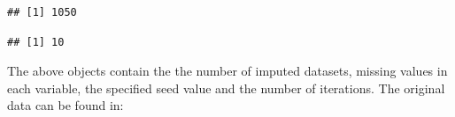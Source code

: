 \documentclass[]{book}
\newenvironment{Shaded}{\begin{snugshade}}{\end{snugshade}}
\newcommand{\OperatorTok}[1]{\textcolor[rgb]{0.81,0.36,0.00}{\textbf{#1}}}
\newcommand{\NormalTok}[1]{#1}
\theoremstyle{definition}
\theoremstyle{definition}
\theoremstyle{definition}
\theoremstyle{remark}
\begin{document}
\begin{verbatim}
## [1] 1050
\end{verbatim}

\begin{Shaded}
\end{Shaded}

\begin{verbatim}
## [1] 10
\end{verbatim}

The above objects contain the the number of imputed datasets, missing
values in each variable, the specified seed value and the number of
iterations. The original data can be found in:

\begin{Shaded}
\end{Shaded}
\end{document}
